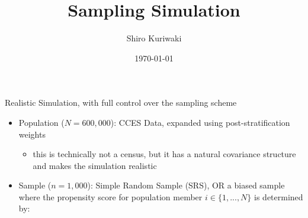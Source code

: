 \documentclass[ignorenonframetext, 10.5pt, aspectratio=169]{beamer}
\title{\textbf{\Large{Sampling Simulation}}}
\author{Shiro Kuriwaki}
\date{\small\today}
\begin{document}
\begin{frame}
\centering
\maketitle
\end{frame}



\begin{frame}
{Realistic Simulation, with full control over the sampling scheme}

\begin{itemize}
	\item Population ($N = 600,000$): CCES Data, expanded using post-stratification weights
	\begin{itemize}
	\item this is technically not a census, but it has a natural covariance structure and makes the simulation realistic
	\end{itemize}
	\item Sample ($n = 1,000$): Simple Random Sample (SRS), OR a biased sample where the propensity score for population member \(i \in \{1, ..., N\}\) is determined by:
\end{itemize}


\end{frame}
\end{document}
